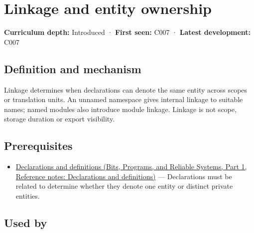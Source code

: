 \hypertarget{appendix-74a0ec818c18}{}\label{referencestart:appendix-74a0ec818c18}
\section{Linkage and entity ownership}\label{appendix-74a0ec818c18-linkage-and-entity-ownership}

\hypertarget{appendix-74a0ec818c18-linkage-and-entity-ownership}{}

\textbf{Curriculum depth:} Introduced · \textbf{First seen:} C007 · \textbf{Latest development:} C007

\begin{allmightroledefinition}

\subsection{Definition and mechanism}\label{appendix-74a0ec818c18-definition-and-mechanism}

\hypertarget{appendix-74a0ec818c18-definition-and-mechanism}{}

Linkage determines when declarations can denote the same entity across scopes or translation units. An unnamed namespace gives internal linkage to suitable names; named modules also introduce module linkage. Linkage is not scope, storage duration or export visibility.

\end{allmightroledefinition}

\subsection{Prerequisites}\label{appendix-74a0ec818c18-prerequisites}

\hypertarget{appendix-74a0ec818c18-prerequisites}{}

\begin{itemize}
\tightlist
\item
  \href{../01-Bits-Programs-and-Reliable-Systems-P01/main.pdf\#nameddest=appendix-2e4d494c2d94}{Declarations and definitions (Bits, Programs, and Reliable Systems, Part 1, Reference notes: Declarations and definitions)} --- Declarations must be related to determine whether they denote one entity or distinct private entities.
\end{itemize}

\subsection{Used by}\label{appendix-74a0ec818c18-used-by}

